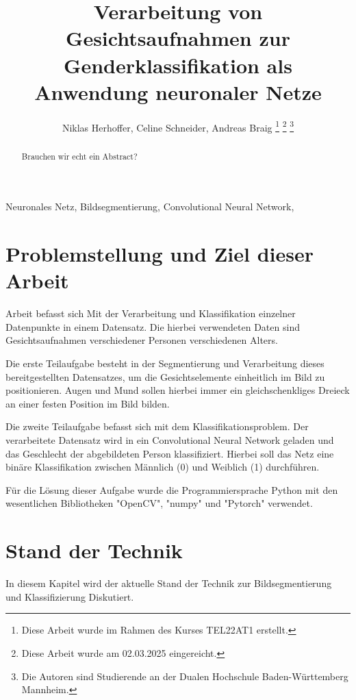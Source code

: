 \documentclass[journal,twoside,web]{ieeecolor}
\begin{document}
\title{Verarbeitung von Gesichtsaufnahmen zur Genderklassifikation als Anwendung neuronaler Netze}
\author{Niklas Herhoffer, Celine Schneider, Andreas Braig
\thanks{Diese Arbeit wurde im Rahmen des Kurses TEL22AT1 erstellt.}
\thanks{Diese Arbeit wurde am 02.03.2025 eingereicht.}  
\thanks{Die Autoren sind Studierende an der Dualen Hochschule Baden-Württemberg Mannheim.}}

\maketitle

\begin{abstract}
    Brauchen wir echt ein Abstract? 
\end{abstract}


\begin{IEEEkeywords}
    Neuronales Netz, Bildsegmentierung, Convolutional Neural Network, 
\end{IEEEkeywords}

\section{Problemstellung und Ziel dieser Arbeit}
\label{sec:introduction}
 Arbeit befasst sich Mit der Verarbeitung und Klassifikation einzelner Datenpunkte in einem Datensatz.
Die hierbei verwendeten Daten sind Gesichtsaufnahmen verschiedener Personen verschiedenen Alters. 

Die erste Teilaufgabe besteht in der Segmentierung und Verarbeitung dieses bereitgestellten Datensatzes, um die Gesichtselemente einheitlich im Bild zu positionieren. 
Augen und Mund sollen hierbei immer ein gleichschenkliges Dreieck an einer festen Position im Bild bilden. 

Die zweite Teilaufgabe befasst sich mit dem Klassifikationsproblem. 
Der verarbeitete Datensatz wird in ein Convolutional Neural Network geladen und das Geschlecht der abgebildeten Person klassifiziert. 
Hierbei soll das Netz eine binäre Klassifikation zwischen Männlich (0) und Weiblich (1) durchführen.

Für die Lösung dieser Aufgabe wurde die Programmiersprache Python mit den wesentlichen Bibliotheken "OpenCV", "numpy" und "Pytorch" verwendet. 

\section{Stand der Technik}
In diesem Kapitel wird der aktuelle Stand der Technik zur Bildsegmentierung und Klassifizierung Diskutiert.
\end{document}

